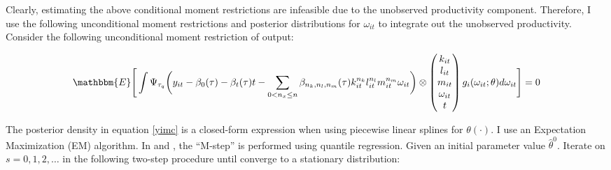 \documentclass{article}
\begin{document}
Clearly, estimating the above conditional moment restrictions are infeasible due to the unobserved productivity component. Therefore, I use the following unconditional moment restrictions and posterior distributions for $\omega_{it}$ to integrate out the unobserved productivity. Consider the following unconditional moment restriction of output:

\begin{equation}\label{yimc}
\mathbbm{E}\Bigg[\int\Psi_{\tau_{q}}\bigg(y_{it}-\beta_{0}(\tau)-\beta_{t}(\tau)t-\sum_{0<n_{x}\leq n}\beta_{n_{k}, n_{l}, n_{m}}(\tau)k_{it}^{n_{k}}l^{n_{l}}_{it}m^{n_{m}}_{it}\omega_{it}\bigg)\otimes
\begin{pmatrix}
k_{it} \\
l_{it}\\
m_{it} \\
\omega_{it} \\
t
\end{pmatrix}
g_{i}(\omega_{it};\theta)d\omega_{it}\Bigg]=0
\end{equation}

The posterior density in equation \eqref{yimc} is a closed-form expression when using piecewise linear splines for $\theta(\cdot)$. I use an Expectation Maximization (EM) algorithm. In \cite{Arellano2016} and \cite{Arellano2017}, the ``M-step'' is performed using quantile regression. Given an initial parameter value $\hat{\theta}^{0}$. Iterate on $s=0,1,2,\dots$ in the following two-step procedure until converge to a stationary distribution:
\end{document}
